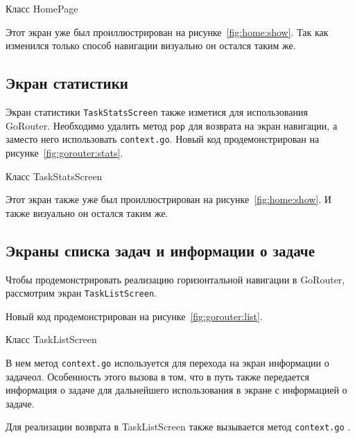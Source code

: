 \begin{image}
	\caption{Класс HomePage}
	\label{fig:gorouter:home}
\end{image}

Этот экран уже был проиллюстрирован на рисунке~\ref{fig:home:show}.
Так как изменился только способ навигации визуально он остался таким же.

\subsection{Экран статистики}

Экран статистики \texttt{TaskStatsScreen} также изметися
для использования GoRouter.
Необходимо удалить метод \texttt{pop} для возврата на экран навигации,
а заместо него использовать \texttt{context.go}.
Новый код продемонстрирован на рисунке~\ref{fig:gorouter:stats}.

\begin{image}
	\caption{Класс TaskStatsScreen}
	\label{fig:gorouter:stats}
\end{image}

Этот экран также уже был проиллюстрирован на рисунке~\ref{fig:home:show}.
И также визуально он остался таким же.

\subsection{Экраны списка задач и информации о задаче}

Чтобы продемонстрировать реализацию горизонтальной навигации в GoRouter,
рассмотрим экран \texttt{TaskListScreen}.

Новый код продемонстрирован на рисунке~\ref{fig:gorouter:list}.

\begin{image}
	\caption{Класс TaskListScreen}
	\label{fig:gorouter:list}
\end{image}

В нем метод \texttt{context.go} используется для перехода
на экран информации о задачеол. Особенность этого вызова в том,
что в путь также передается информация о задаче для дальнейшего использования
в экране с информацией о задаче.\par
Для реализации возврата в TaskListScreen
также вызывается метод \texttt{context.go} .

